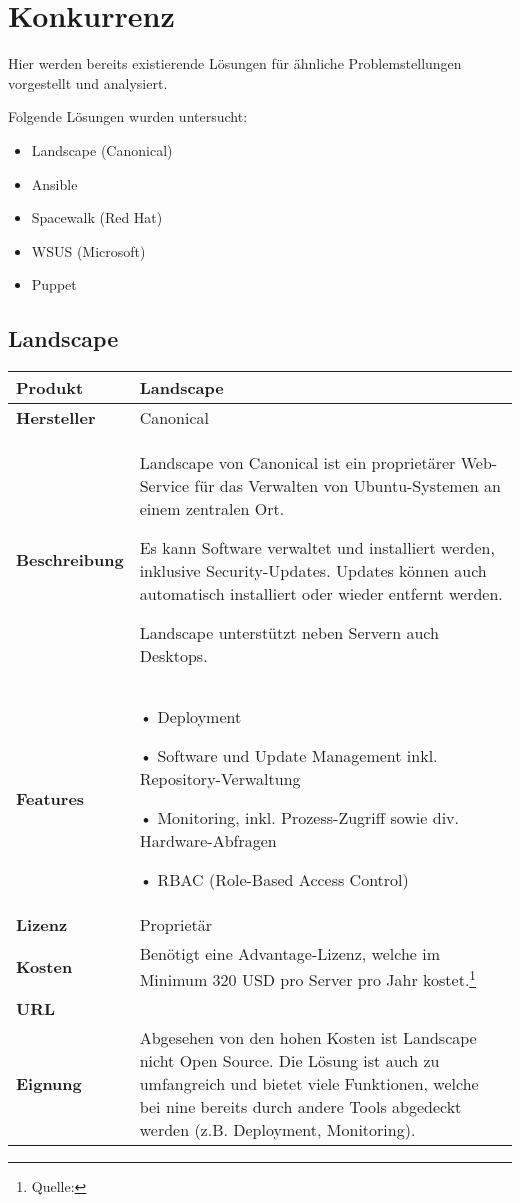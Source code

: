 \section{Konkurrenz} \label{sec:analysis:competition}

Hier werden bereits existierende Lösungen für ähnliche Problemstellungen vorgestellt und analysiert.

Folgende Lösungen wurden untersucht:
\begin{itemize}
\item Landscape (Canonical)
\item Ansible
\item Spacewalk (Red Hat)
\item WSUS (Microsoft)
\item Puppet
\end{itemize}

\newcommand{\competitor}[8]{
	\begin{tabularx}{\linewidth}{lX}
		\toprule
		\textbf{Produkt} & #1\\
		\midrule
		\textbf{Hersteller} & #2\\
		\textbf{Beschreibung} & #3\\
		\textbf{Features} & #4\\
        \textbf{Lizenz} & #5\\
		\textbf{Kosten} & #6\\
        \textbf{URL} & #7\\
        \textbf{Eignung} & #8\\
		\bottomrule
	\end{tabularx}
}

\subsection*{Landscape} \label{sec:analysis:competition:landscape}

\competitor{Landscape}
{Canonical}
{Landscape von Canonical ist ein proprietärer Web-Service für das Verwalten von Ubuntu-Systemen an einem zentralen Ort.

Es kann Software verwaltet und installiert werden, inklusive Security-Updates. Updates können auch automatisch installiert oder wieder entfernt werden.

Landscape unterstützt neben Servern auch Desktops.}
{
• Deployment

• Software und Update Management inkl. Repository-Verwaltung

• Monitoring, inkl. Prozess-Zugriff sowie div. Hardware-Abfragen

• RBAC (Role-Based Access Control)
}
{Proprietär}
{Benötigt eine Advantage-Lizenz, welche im Minimum 320 USD pro Server pro Jahr kostet.\footnote{Quelle: \purl{http://www.ubuntu.com/management/ubuntu-advantage}}}
{\purl{https://landscape.canonical.com/}}
{Abgesehen von den hohen Kosten ist Landscape nicht Open Source. Die Lösung ist auch zu umfangreich und bietet viele Funktionen, welche bei \gls{nine} bereits durch andere Tools abgedeckt werden (z.B. Deployment, Monitoring).}


